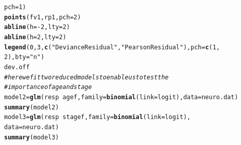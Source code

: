 \documentclass[oneside]{book}\usepackage[]{graphicx}\usepackage[svgnames]{xcolor}
\makeatletter
\newcommand{\hlnum}[1]{\textcolor[rgb]{0.686,0.059,0.569}{#1}}%
\newcommand{\hlstr}[1]{\textcolor[rgb]{0.192,0.494,0.8}{#1}}%
\newcommand{\hlcom}[1]{\textcolor[rgb]{0.678,0.584,0.686}{\textit{#1}}}%
\newcommand{\hlopt}[1]{\textcolor[rgb]{0,0,0}{#1}}%
\newcommand{\hlstd}[1]{\textcolor[rgb]{0.345,0.345,0.345}{#1}}%
\newcommand{\hlkwb}[1]{\textcolor[rgb]{0.69,0.353,0.396}{#1}}%
\newcommand{\hlkwc}[1]{\textcolor[rgb]{0.333,0.667,0.333}{#1}}%
\newcommand{\hlkwd}[1]{\textcolor[rgb]{0.737,0.353,0.396}{\textbf{#1}}}%
\newenvironment{kframe}{%
 \def\at@end@of@kframe{}%
 \ifinner\ifhmode%
  \def\at@end@of@kframe{\end{minipage}}%
  \begin{minipage}{\columnwidth}%
 \fi\fi%
 \def\FrameCommand##1{\hskip\@totalleftmargin \hskip-\fboxsep
 \colorbox{shadecolor}{##1}\hskip-\fboxsep
     \hskip-\linewidth \hskip-\@totalleftmargin \hskip\columnwidth}%
 \MakeFramed {\advance\hsize-\width
   \@totalleftmargin\z@ \linewidth\hsize
   \@setminipage}}%
 {\par\unskip\endMakeFramed%
 \at@end@of@kframe}
\newenvironment{knitrout}{}{} %
\makeatother
\begin{document}
\begin{knitrout}
\begin{kframe}
\begin{alltt}
  \hlkwc{pch} \hlstd{=} \hlnum{1}\hlstd{)}
\hlkwd{points}\hlstd{(fv1, rp1,} \hlkwc{pch} \hlstd{=} \hlnum{2}\hlstd{)}
\hlkwd{abline}\hlstd{(}\hlkwc{h} \hlstd{=} \hlopt{-}\hlnum{2}\hlstd{,} \hlkwc{lty} \hlstd{=} \hlnum{2}\hlstd{)}
\hlkwd{abline}\hlstd{(}\hlkwc{h} \hlstd{=} \hlnum{2}\hlstd{,} \hlkwc{lty} \hlstd{=} \hlnum{2}\hlstd{)}
\hlkwd{legend}\hlstd{(}\hlnum{0}\hlstd{,} \hlnum{3}\hlstd{,} \hlkwd{c}\hlstd{(}\hlstr{"Deviance Residual"}\hlstd{,} \hlstr{"Pearson Residual"}\hlstd{),} \hlkwc{pch} \hlstd{=} \hlkwd{c}\hlstd{(}\hlnum{1}\hlstd{,}
  \hlnum{2}\hlstd{),} \hlkwc{bty} \hlstd{=} \hlstr{"n"}\hlstd{)}
\hlstd{dev.off}
\hlcom{# here we fit two reduced models to enable us to test the}
\hlcom{# importance of age and stage}
\hlstd{model2} \hlkwb{=} \hlkwd{glm}\hlstd{(resp} \hlopt{~} \hlstd{agef,} \hlkwc{family} \hlstd{=} \hlkwd{binomial}\hlstd{(}\hlkwc{link} \hlstd{= logit),} \hlkwc{data} \hlstd{= neuro.dat)}
\hlkwd{summary}\hlstd{(model2)}
\hlstd{model3} \hlkwb{=} \hlkwd{glm}\hlstd{(resp} \hlopt{~} \hlstd{stagef,} \hlkwc{family} \hlstd{=} \hlkwd{binomial}\hlstd{(}\hlkwc{link} \hlstd{= logit),}
  \hlkwc{data} \hlstd{= neuro.dat)}
\hlkwd{summary}\hlstd{(model3)}
\end{alltt}
\end{kframe}
\end{knitrout}
\end{document}
